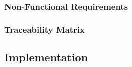\subsubsection{Non-Functional Requirements}
\subsubsection{Traceability Matrix}

\subsection{Implementation}

\newpage